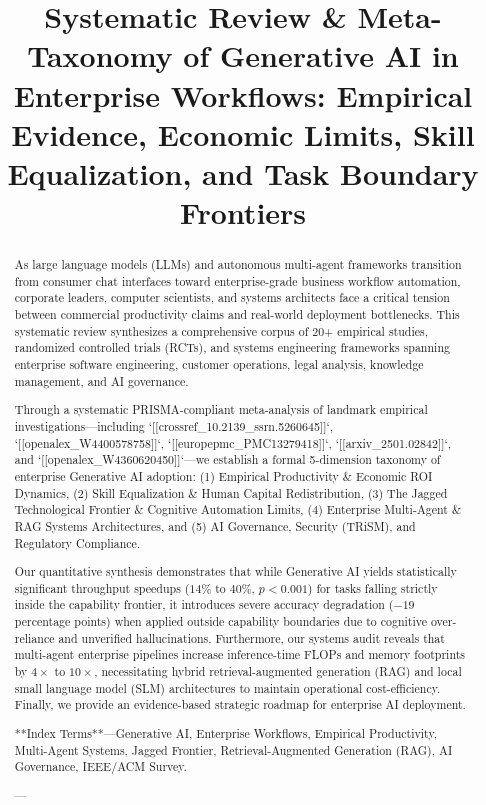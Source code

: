 \documentclass[10pt,journal,compsoc,twocolumn]{IEEEtran}
\begin{document}
\title{Systematic Review \& Meta-Taxonomy of Generative AI in Enterprise Workflows: Empirical Evidence, Economic Limits, Skill Equalization, and Task Boundary Frontiers}

\author{
 \and {}
}

\maketitle

\begin{abstract}
As large language models (LLMs) and autonomous multi-agent frameworks transition from consumer chat interfaces toward enterprise-grade business workflow automation, corporate leaders, computer scientists, and systems architects face a critical tension between commercial productivity claims and real-world deployment bottlenecks. This systematic review synthesizes a comprehensive corpus of 20+ empirical studies, randomized controlled trials (RCTs), and systems engineering frameworks spanning enterprise software engineering, customer operations, legal analysis, knowledge management, and AI governance. 

Through a systematic PRISMA-compliant meta-analysis of landmark empirical investigations—including `[[crossref\_10.2139\_ssrn.5260645]]`, `[[openalex\_W4400578758]]`, `[[europepmc\_PMC13279418]]`, `[[arxiv\_2501.02842]]`, and `[[openalex\_W4360620450]]`—we establish a formal 5-dimension taxonomy of enterprise Generative AI adoption: (1) Empirical Productivity \& Economic ROI Dynamics, (2) Skill Equalization \& Human Capital Redistribution, (3) The Jagged Technological Frontier \& Cognitive Automation Limits, (4) Enterprise Multi-Agent \& RAG Systems Architectures, and (5) AI Governance, Security (TRiSM), and Regulatory Compliance. 

Our quantitative synthesis demonstrates that while Generative AI yields statistically significant throughput speedups ($14\%$ to $40\%$, $p < 0.001$) for tasks falling strictly inside the capability frontier, it introduces severe accuracy degradation ($-19$ percentage points) when applied outside capability boundaries due to cognitive over-reliance and unverified hallucinations. Furthermore, our systems audit reveals that multi-agent enterprise pipelines increase inference-time FLOPs and memory footprints by $4\times$ to $10\times$, necessitating hybrid retrieval-augmented generation (RAG) and local small language model (SLM) architectures to maintain operational cost-efficiency. Finally, we provide an evidence-based strategic roadmap for enterprise AI deployment.

**Index Terms**—Generative AI, Enterprise Workflows, Empirical Productivity, Multi-Agent Systems, Jagged Frontier, Retrieval-Augmented Generation (RAG), AI Governance, IEEE/ACM Survey.

---
\end{abstract}
\end{document}
